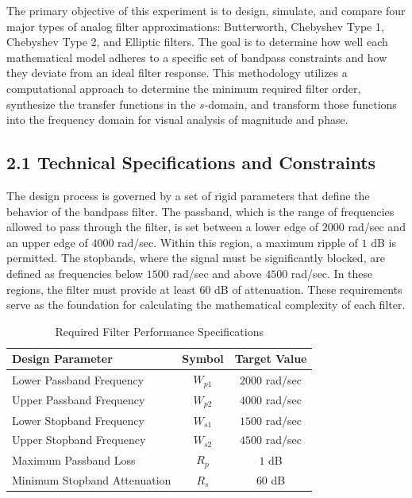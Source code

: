 The primary objective of this experiment is to design, simulate, and compare four major types of analog filter approximations: Butterworth, Chebyshev Type 1, Chebyshev Type 2, and Elliptic filters. The goal is to determine how well each mathematical model adheres to a specific set of bandpass constraints and how they deviate from an ideal filter response. This methodology utilizes a computational approach to determine the minimum required filter order, synthesize the transfer functions in the $s$-domain, and transform those functions into the frequency domain for visual analysis of magnitude and phase.

\subsection*{2.1 Technical Specifications and Constraints}

The design process is governed by a set of rigid parameters that define the behavior of the bandpass filter. The passband, which is the range of frequencies allowed to pass through the filter, is set between a lower edge of $2000$ rad/sec and an upper edge of $4000$ rad/sec. Within this region, a maximum ripple of $1$ dB is permitted. The stopbands, where the signal must be significantly blocked, are defined as frequencies below $1500$ rad/sec and above $4500$ rad/sec. In these regions, the filter must provide at least $60$ dB of attenuation. These requirements serve as the foundation for calculating the mathematical complexity of each filter.

\begin{table}[h]
\centering
\small
\begin{tabular}{|l|c|c|} 
\hline
\textbf{Design Parameter} & \textbf{Symbol} & \textbf{Target Value} \\ \hline
Lower Passband Frequency & $W_{p1}$ & $2000$ rad/sec \\ \hline
Upper Passband Frequency & $W_{p2}$ & $4000$ rad/sec \\ \hline
Lower Stopband Frequency & $W_{s1}$ & $1500$ rad/sec \\ \hline
Upper Stopband Frequency & $W_{s2}$ & $4500$ rad/sec \\ \hline
Maximum Passband Loss & $R_p$ & $1$ dB \\ \hline
Minimum Stopband Attenuation & $R_s$ & $60$ dB \\ \hline
\end{tabular}
\caption{Required Filter Performance Specifications}
\label{tab:filter_specs}
\end{table}

